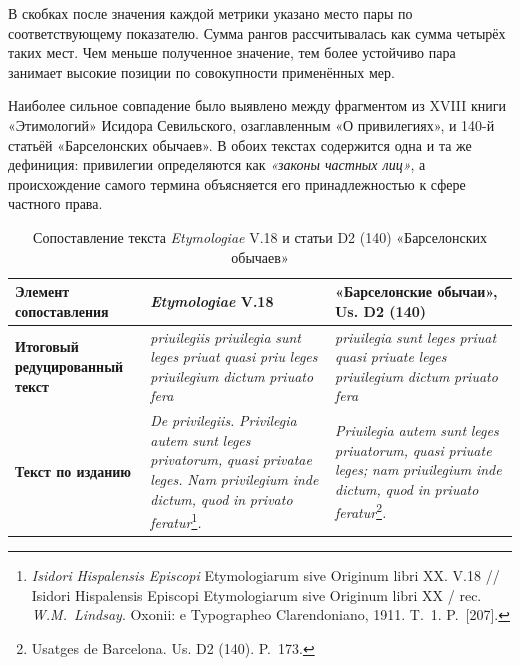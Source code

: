 В скобках после значения каждой метрики указано место пары по соответствующему показателю. Сумма рангов рассчитывалась как сумма четырёх таких мест. Чем меньше полученное значение, тем более устойчиво пара занимает высокие позиции по совокупности применённых мер.

Наиболее сильное совпадение было выявлено между фрагментом из XVIII книги «Этимологий» Исидора Севильского, озаглавленным «О привилегиях», и 140-й статьёй «Барселонских обычаев». В обоих текстах содержится одна и та же дефиниция: привилегии определяются как \emph{«законы частных лиц»}, а происхождение самого термина объясняется его принадлежностью к сфере частного права.

\begin{center}
\small
\setlength{\tabcolsep}{2pt}
\begin{longtable}{|p{}|p{}|p{}|}
\caption{Сопоставление текста \emph{Etymologiae} V.18 и статьи D2 (140) «Барселонских обычаев»}\label{tab:ch1-etymologiae}\\
\hline
\textbf{Элемент сопоставления} & \textbf{\emph{Etymologiae}}\textbf{ V.18} & \textbf{«Барселонские обычаи», }\textbf{ }\textbf{Us}\textbf{. D2 (140)} \\ \hline
\textbf{Итоговый редуцированный текст} & \emph{priuilegiis}\emph{ }\emph{priuilegia}\emph{ }\emph{sunt}\emph{ }\emph{leges}\emph{ }\emph{priuat}\emph{ }\emph{quasi}\emph{ }\emph{priu}\emph{ }\emph{leges}\emph{ }\emph{priuilegium}\emph{ }\emph{dictum}\emph{ }\emph{priuato}\emph{ }\emph{fera} & \emph{priuilegia}\emph{ sunt leges }\emph{priuat}\emph{ quasi }\emph{priuate}\emph{ leges }\emph{priuilegium}\emph{ dictum }\emph{priuato}\emph{ }\emph{fera} \\ \hline
\textbf{Текст по изданию} & \emph{De }\emph{privilegiis}\emph{. }\emph{Privilegia}\emph{ }\emph{autem}\emph{ }\emph{sunt}\emph{ }\emph{leges}\emph{ }\emph{privatorum}\emph{, }\emph{quasi}\emph{ }\emph{privatae}\emph{ }\emph{leges}\emph{. }\emph{Nam}\emph{ }\emph{privilegium}\emph{ }\emph{inde}\emph{ }\emph{dictum}\emph{, }\emph{quod}\emph{ in }\emph{privato}\emph{ }\emph{feratur}\footnote{\emph{Isidori}\emph{ }\emph{Hispalensis}\emph{ }\emph{Episcopi} Etymologiarum sive Originum libri XX. V.18 // Isidori Hispalensis Episcopi Etymologiarum sive Originum libri XX / rec. \emph{W.M.~Lindsay}. Oxonii: e Typographeo Clarendoniano, 1911. T.~1. P.~[207].}\emph{.} & \emph{Priuilegia}\emph{ }\emph{autem}\emph{ }\emph{sunt}\emph{ }\emph{leges}\emph{ }\emph{priuatorum}\emph{, }\emph{quasi}\emph{ }\emph{priuate}\emph{ }\emph{leges}\emph{; }\emph{nam}\emph{ }\emph{priuilegium}\emph{ }\emph{inde}\emph{ }\emph{dictum}\emph{, }\emph{quod}\emph{ in }\emph{priuato}\emph{ }\emph{feratur}\footnote{Usatges de Barcelona. Us. D2 (140). P.~173.}\emph{.} \\ \hline

\end{longtable}
\end{center}
